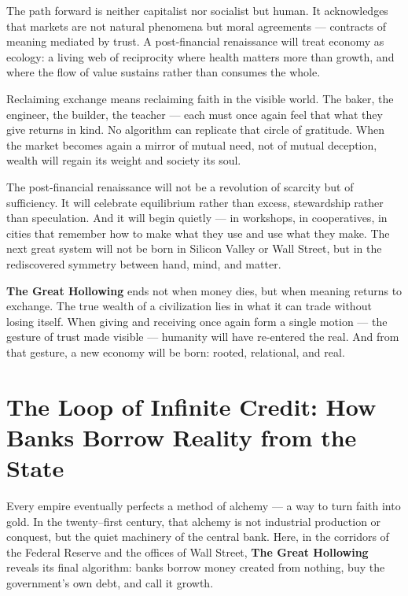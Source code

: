 \documentclass[11pt,twoside]{book}
\begin{document}
The path forward is neither capitalist nor socialist but human.  
It acknowledges that markets are not natural phenomena but moral agreements — contracts of meaning mediated by trust.  
A post-financial renaissance will treat economy as ecology: a living web of reciprocity where health matters more than growth, and where the flow of value sustains rather than consumes the whole.

\bigskip

Reclaiming exchange means reclaiming faith in the visible world.  
The baker, the engineer, the builder, the teacher — each must once again feel that what they give returns in kind.  
No algorithm can replicate that circle of gratitude.  
When the market becomes again a mirror of mutual need, not of mutual deception, wealth will regain its weight and society its soul.

The post-financial renaissance will not be a revolution of scarcity but of sufficiency.  
It will celebrate equilibrium rather than excess, stewardship rather than speculation.  
And it will begin quietly — in workshops, in cooperatives, in cities that remember how to make what they use and use what they make.  
The next great system will not be born in Silicon Valley or Wall Street, but in the rediscovered symmetry between hand, mind, and matter.

\textbf{The Great Hollowing} ends not when money dies, but when meaning returns to exchange.  
The true wealth of a civilization lies in what it can trade without losing itself.  
When giving and receiving once again form a single motion — the gesture of trust made visible — humanity will have re-entered the real.  
And from that gesture, a new economy will be born: rooted, relational, and real.

% 
\chapter{The Loop of Infinite Credit: How Banks Borrow Reality from the State}
\label{ch:39} %

Every empire eventually perfects a method of alchemy — a way to turn faith into gold.  
In the twenty–first century, that alchemy is not industrial production or conquest, but the quiet machinery of the central bank.  
Here, in the corridors of the Federal Reserve and the offices of Wall Street, \textbf{The Great Hollowing} reveals its final algorithm: banks borrow money created from nothing, buy the government’s own debt, and call it growth.
\end{document}
